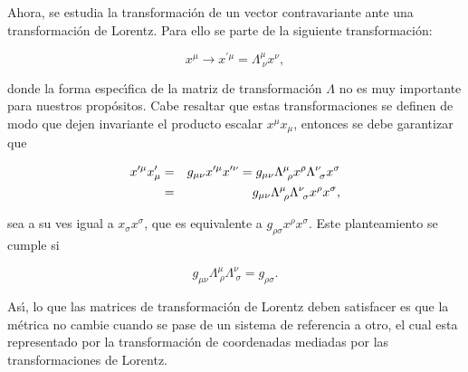 Ahora, se estudia la transformación de un vector contravariante ante una transformación de Lorentz. Para ello se parte de la siguiente transformación:

\begin{equation}
x^{\mu}\rightarrow x^{\prime \mu}=\Lambda^{\mu}_{~\nu} x^{\nu},
\label{26}
\end{equation}

donde la forma espec\'{\i}fica de la matriz de transformación $\Lambda$ no es muy importante para nuestros prop\'{o}sitos. Cabe resaltar que estas transformaciones se definen
de modo que dejen invariante el producto escalar $x^{\mu }x_{\mu}$, entonces se debe garantizar que

\begin{eqnarray}
x^{\prime \mu }x_{\mu }^{\prime } &=&g_{\mu \nu }x^{\prime \mu }x^{\prime
\nu }=g_{\mu \nu }\Lambda_{~\rho}^{\mu}x^{\rho}\Lambda _{~\sigma }^{\nu
}x^{\sigma}  \label{27} \\
&=&g_{\mu \nu }\Lambda _{~\rho}^{\mu}\Lambda _{~\sigma}^{\nu}x^{\rho}x^{\sigma}  \notag,
\end{eqnarray}

sea a su ves igual a $x_{\sigma }x^{\sigma}$, que es equivalente a $g_{\rho \sigma}x^{\rho}x^{\sigma}$. Este planteamiento se cumple si

\begin{equation}
g_{\mu \nu }\Lambda _{~\rho}^{\mu }\Lambda _{~\sigma }^{\nu }=g_{\rho \sigma }.
\label{28}
\end{equation}

As\'{\i}, lo que las matrices de transformaci\'{o}n de Lorentz deben
satisfacer es que la m\'{e}trica no cambie cuando se pase de un sistema de
referencia a otro, el cual esta representado por la transformaci\'{o}n de
coordenadas mediadas por las transformaciones de Lorentz.

